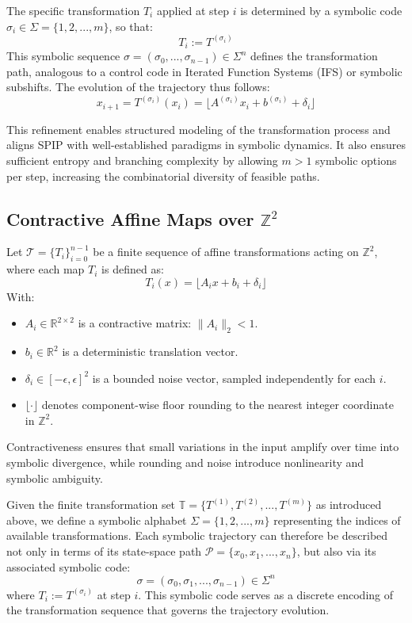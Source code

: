 \documentclass[twocolumn,10pt]{article}
\begin{document}
The specific transformation $T_i$ applied at step $i$ is determined by a symbolic code $\sigma_i \in \Sigma = \{1, 2, ..., m\}$, so that:
\[
T_i := T^{(\sigma_i)}
\]
This symbolic sequence $\sigma = (\sigma_0, ..., \sigma_{n-1}) \in \Sigma^n$ defines the transformation path, analogous to a control code in Iterated Function Systems (IFS) or symbolic subshifts. The evolution of the trajectory thus follows:
\[
x_{i+1} = T^{(\sigma_i)}(x_i) = \lfloor A^{(\sigma_i)} x_i + b^{(\sigma_i)} + \delta_i \rfloor
\]

This refinement enables structured modeling of the transformation process and aligns SPIP with well-established paradigms in symbolic dynamics. It also ensures sufficient entropy and branching complexity by allowing $m > 1$ symbolic options per step, increasing the combinatorial diversity of feasible paths.


\subsection{Contractive Affine Maps over $\mathbb{Z}^2$}

Let $\mathcal{T} = \{T_i\}_{i=0}^{n-1}$ be a finite sequence of affine transformations acting on $\mathbb{Z}^2$, where each map $T_i$ is defined as:
\[
T_i(x) = \lfloor A_i x + b_i + \delta_i \rfloor
\]
With:
\begin{itemize}
    \item $A_i \in \mathbb{R}^{2 \times 2}$ is a contractive matrix: $\|A_i\|_2 < 1$.
    \item $b_i \in \mathbb{R}^2$ is a deterministic translation vector.
    \item $\delta_i \in [-\epsilon, \epsilon]^2$ is a bounded noise vector, sampled independently for each $i$.
    \item $\lfloor \cdot \rfloor$ denotes component-wise floor rounding to the nearest integer coordinate in $\mathbb{Z}^2$.
\end{itemize}

Contractiveness ensures that small variations in the input amplify over time into symbolic divergence, while rounding and noise introduce nonlinearity and symbolic ambiguity.


Given the finite transformation set $\mathbb{T} = \{T^{(1)}, T^{(2)}, ..., T^{(m)}\}$ as introduced above, we define a symbolic alphabet $\Sigma = \{1, 2, ..., m\}$ representing the indices of available transformations. Each symbolic trajectory can therefore be described not only in terms of its state-space path $\mathcal{P} = \{x_0, x_1, ..., x_n\}$, but also via its associated symbolic code:
\[
\sigma = (\sigma_0, \sigma_1, ..., \sigma_{n-1}) \in \Sigma^n
\]
where $T_i := T^{(\sigma_i)}$ at step $i$. This symbolic code serves as a discrete encoding of the transformation sequence that governs the trajectory evolution.
\end{document}
